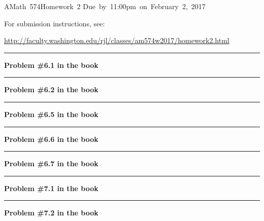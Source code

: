 \documentclass[11pt]{article}
\begin{document}
\hfill\vbox{\hbox{AMath 574}\hbox{Homework 2}
\hbox{Due by 11:00pm on February 2, 2017}}

For submission instructions, see:

\url{http://faculty.washington.edu/rjl/classes/am574w2017/homework2.html}


\vskip 1cm
\hrule
{\bf Problem \#6.1 in the book}




\vskip 1cm
\hrule
{\bf Problem \#6.2 in the book}





\vskip 1cm
\hrule
{\bf Problem \#6.5 in the book}





\vskip 1cm
\hrule
{\bf Problem \#6.6 in the book}



\vskip 1cm
\hrule
{\bf Problem \#6.7 in the book}



\vskip 1cm
\hrule
{\bf Problem \#7.1 in the book}



\vskip 1cm
\hrule
{\bf Problem \#7.2 in the book}
\end{document}
